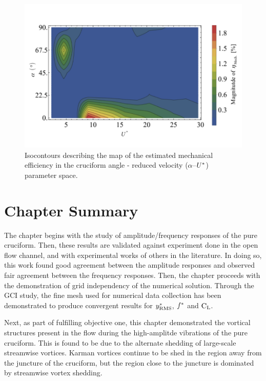 \documentclass[oneside]{utmthesis}
\begin{document}
\begin{figure}[H]
  \centering
  \includegraphics[width=1\textwidth]{figs/powerEfficiencyContours}
  \caption{Isocontours describing the map of the estimated mechanical efficiency in the cruciform angle - reduced velocity ($\alpha$--$U^{*}$) parameter space.}
  \label{fig:powerEfficiencyContour}
\end{figure}

\section{Chapter Summary} \label{ssec:chapSumResults}

\vspace{\baselineskip}

The chapter begins with the study of amplitude/frequency responses of the pure cruciform. Then, these results are validated against  experiment done in the open flow channel, and with experimental works of others in the literature. In doing so, this work found good agreement between the amplitude responses and observed fair agreement between the frequency responses. Then, the chapter proceeds with the demonstration of grid independency of the numerical solution. Through the GCI study, the fine mesh used for numerical data collection has been demonstrated to produce convergent results for $y^{*}_{\text{RMS}}$, $f^{*}$ and $\text{C}_{\text{L}}$.

Next, as part of fulfilling objective one, this chapter demonstrated the vortical structures present in the flow during the high-amplitde vibrations of the pure cruciform. This is found to be due to the alternate shedding of large-scale streamwise vortices. Karman vortices continue to be shed in the region away from the juncture of the cruciform, but the region close to the juncture is dominated by streamwise vortex shedding.
\end{document}
